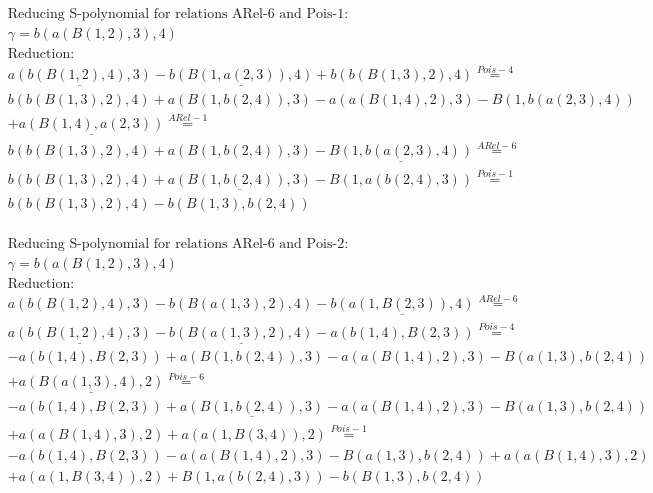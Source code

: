 \documentclass[11pt]{amsart}
\begin{document}
\begin{align*} 
& \text{Reducing S-polynomial for relations ARel-6 and Pois-1:} \\ 
& \gamma = b(a(B(1,2),3),4) \\ 
& \text{Reduction}: \\&\underline{a(b(B(1,2),4),3)} - \underline{b(B(1,a(2,3)),4)} + b(b(B(1,3),2),4) \stackrel{ Pois-4 }{=}  \\ 
&b(b(B(1,3),2),4) + a(B(1,b(2,4)),3) - a(a(B(1,4),2),3) - B(1,b(a(2,3),4))\\ 
 &  + \underline{a(B(1,4),a(2,3))} \stackrel{ ARel-1 }{=}  \\ 
&b(b(B(1,3),2),4) + a(B(1,b(2,4)),3) - \underline{B(1,b(a(2,3),4))} \stackrel{ ARel-6 }{=}  \\ 
&b(b(B(1,3),2),4) + \underline{a(B(1,b(2,4)),3)} - B(1,a(b(2,4),3)) \stackrel{ Pois-1 }{=}  \\ 
&b(b(B(1,3),2),4) - b(B(1,3),b(2,4))\\ 
\end{align*} 
 
\begin{align*} 
& \text{Reducing S-polynomial for relations ARel-6 and Pois-2:} \\ 
& \gamma = b(a(B(1,2),3),4) \\ 
& \text{Reduction}: \\&a(b(B(1,2),4),3) - b(B(a(1,3),2),4) - \underline{b(a(1,B(2,3)),4)} \stackrel{ ARel-6 }{=}  \\ 
&\underline{a(b(B(1,2),4),3)} - \underline{b(B(a(1,3),2),4)} - a(b(1,4),B(2,3)) \stackrel{ Pois-4 }{=}  \\ 
& - a(b(1,4),B(2,3)) + a(B(1,b(2,4)),3) - a(a(B(1,4),2),3) - B(a(1,3),b(2,4))\\ 
 &  + \underline{a(B(a(1,3),4),2)} \stackrel{ Pois-6 }{=}  \\ 
& - a(b(1,4),B(2,3)) + \underline{a(B(1,b(2,4)),3)} - a(a(B(1,4),2),3) - B(a(1,3),b(2,4))\\ 
 &  + a(a(B(1,4),3),2) + a(a(1,B(3,4)),2) \stackrel{ Pois-1 }{=}  \\ 
& - a(b(1,4),B(2,3)) - a(a(B(1,4),2),3) - B(a(1,3),b(2,4)) + a(a(B(1,4),3),2)\\ 
 &  + a(a(1,B(3,4)),2) + B(1,a(b(2,4),3)) - b(B(1,3),b(2,4))\\ 
\end{align*} 
 
\end{document}
